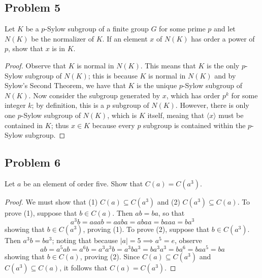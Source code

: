 \documentclass{article}
\begin{document}
\subsection*{Problem 5}
Let $K$ be a $p$-Sylow subgroup of a finite group $G$ for some prime $p$ and let 
$N(K)$ be the normalizer of $K$. If an element $x$ of $N(K)$ has order a power of 
$p$, show that $x$ is in $K$.
\begin{proof}
	Observe that $K$ is normal in $N(K)$. This means that $K$ is the only $p$-Sylow
	subgroup of $N(K)$; this is because $K$ is normal in $N(K)$ and by Sylow's Second
	Theorem, we have that $K$ is the unique $p$-Sylow subgroup of $N(K)$. Now consider
	the subgroup generated by $x$, which has order $p^k$ for some integer $k$; by
	definition, this is a $p$ subgroup of $N(K)$. However, there is only one
	$p$-Sylow subgroup of $N(K)$, which is $K$ itself, meaing that $\langle x \rangle$
	must be contained in $K$; thus $x \in K$ because every $p$ subgroup is contained
	within the $p$-Sylow subgroup. 
\end{proof}

\subsection*{Problem 6}
Let $a$ be an element of order five. Show that $C(a) = C(a^3)$.
\begin{proof}
	We must show that (1) $C(a) \subseteq C(a^3)$ and (2) $C(a^3) \subseteq C(a)$. 
	To prove (1), suppose that $b \in C(a)$. Then $ab = ba$, so that
	\[a^3b = aaab = aaba = abaa = baaa = ba^3 \]
	showing that $b \in C(a^3)$, proving (1). To prove (2), suppose that 
	$b \in C(a^3)$. Then $a^3b = ba^3$; noting that because 
	$|a| = 5 \implies a^5 = e$, observe
	\[ ab = a^5ab = a^6b = a^3a^3b = a^3ba^3 = ba^3a^3 = ba^6 = baa^5 = ba\]
	showing that $b \in C(a)$, proving (2). Since $C(a) \subseteq C(a^3)$ and $C(a^3)
	\subseteq C(a)$, it follows that $C(a) = C(a^3)$.
\end{proof}
\end{document}

